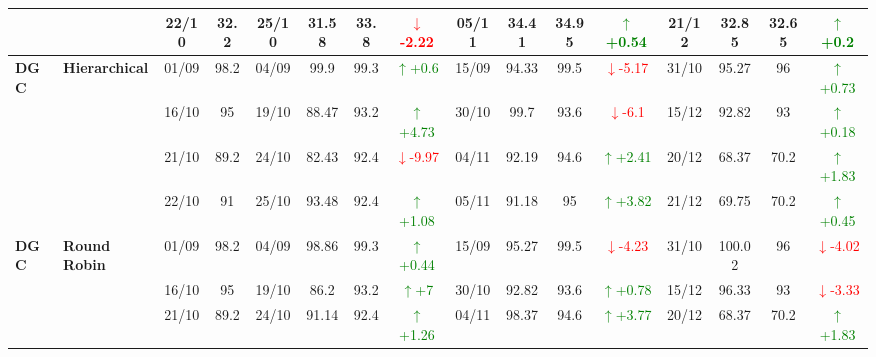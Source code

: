 \documentclass{ieeeaccess}
\begin{document}
{\begin{longtable}{llcc|cccc|cccc|cccc}
&
& 22/10 & 32.2 & 25/10 & 31.58 & 33.8 & \textcolor{red}{\(\downarrow\)-2.22} & 05/11 & 34.41 & 34.95 & \textcolor{green}{\(\uparrow\)+0.54} & 21/12 & 32.85 & 32.65 & \textcolor{green}{\(\uparrow\)+0.2} \\
\midrule




\multirow{4}{*}{\textbf{DGC}} 
& \textbf{Hierarchical}
& 01/09 & 98.2 & 04/09 & 99.9 & 99.3 & \textcolor{green}{\(\uparrow\)+0.6} & 15/09 & 94.33 & 99.5 & \textcolor{red}{\(\downarrow\)-5.17} & 31/10 & 95.27 & 96 & \textcolor{green}{\(\uparrow\)+0.73} \\

&
& 16/10 & 95 & 19/10 & 88.47 & 93.2 & \textcolor{green}{\(\uparrow\)+4.73} & 30/10 & 99.7 & 93.6 & \textcolor{red}{\(\downarrow\)-6.1} & 15/12 & 92.82 & 93 & \textcolor{green}{\(\uparrow\)+0.18} \\

&
& 21/10 & 89.2 & 24/10 & 82.43 & 92.4 & \textcolor{red}{\(\downarrow\)-9.97} & 04/11 & 92.19 & 94.6 & \textcolor{green}{\(\uparrow\)+2.41} & 20/12 & 68.37 & 70.2 & \textcolor{green}{\(\uparrow\)+1.83} \\

&
& 22/10 & 91 & 25/10 & 93.48 & 92.4 & \textcolor{green}{\(\uparrow\)+1.08} & 05/11 & 91.18 & 95 & \textcolor{green}{\(\uparrow\)+3.82} & 21/12 & 69.75 & 70.2 & \textcolor{green}{\(\uparrow\)+0.45} \\
\midrule


\multirow{4}{*}{\textbf{DGC}} 
& \textbf{Round Robin}
& 01/09 & 98.2 & 04/09 & 98.86 & 99.3 & \textcolor{green}{\(\uparrow\)+0.44} & 15/09 & 95.27 & 99.5 & \textcolor{red}{\(\downarrow\)-4.23} & 31/10 & 100.02 & 96 & \textcolor{red}{\(\downarrow\)-4.02} \\

&
& 16/10 & 95 & 19/10 & 86.2 & 93.2 & \textcolor{green}{\(\uparrow\)+7} & 30/10 & 92.82 & 93.6 & \textcolor{green}{\(\uparrow\)+0.78} & 15/12 & 96.33 & 93 & \textcolor{red}{\(\downarrow\)-3.33} \\

&
& 21/10 & 89.2 & 24/10 & 91.14 & 92.4 & \textcolor{green}{\(\uparrow\)+1.26} & 04/11 & 98.37 & 94.6 & \textcolor{green}{\(\uparrow\)+3.77} & 20/12 & 68.37 & 70.2 & \textcolor{green}{\(\uparrow\)+1.83} \\


\end{longtable}}
\end{document}
